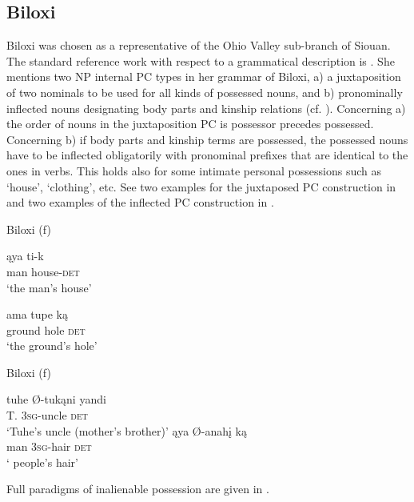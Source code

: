\documentclass[output=paper]{LSP/langsci}
\begin{document}
\subsection{Biloxi}\label{sec:helmbrecht:4.6}\label{biloxi}
Biloxi was chosen as a representative of the Ohio Valley sub-branch of Siouan. The standard reference work with respect to a grammatical description is \citet{Einaudi1976}. She mentions two NP internal PC types in her grammar of Biloxi, a) a juxtaposition of two nominals to be used for all kinds of possessed nouns, and b) pronominally inflected nouns designating body parts and kinship relations (cf. \citealt[57--68]{Einaudi1976}). Concerning a) the order of nouns in the juxtaposition PC is possessor precedes possessed. Concerning b) if body parts and kinship terms are possessed, the possessed nouns have to be inflected obligatorily with pronominal prefixes that are identical to the ones in verbs. This holds also for some intimate personal possessions such as `house', `clothing', etc. See two examples for the juxtaposed PC construction in  and two examples of the inflected PC construction in .

\ea Biloxi (\citealt[139]{Einaudi1976}f) \label{biloxihouse}

\ea
\gll \k{a}ya   ti-k		\\				
man house-\textsc{det} \\
\glt `the man's house'

\ex 
\gll ama tupe k\k{a} \\
ground hole \textsc{det} \\
\glt `the ground's hole'
\z \z

\ea	Biloxi (\citealt[139]{Einaudi1976}f) \label{biloxiuncle}

\ea \gll tuhe   Ø-tukąni       yandi	\\  
T.      \textsc{3sg}-uncle    \textsc{det} \\
\glt `Tuhe's uncle (mother's brother)'
\ex \gll ąya   Ø-anahį    k\k{a} \\
man \textsc{3sg}-hair   \textsc{det} \\
\glt `	people's hair'
\z \z

Full paradigms of inalienable possession are given in .
\end{document}
